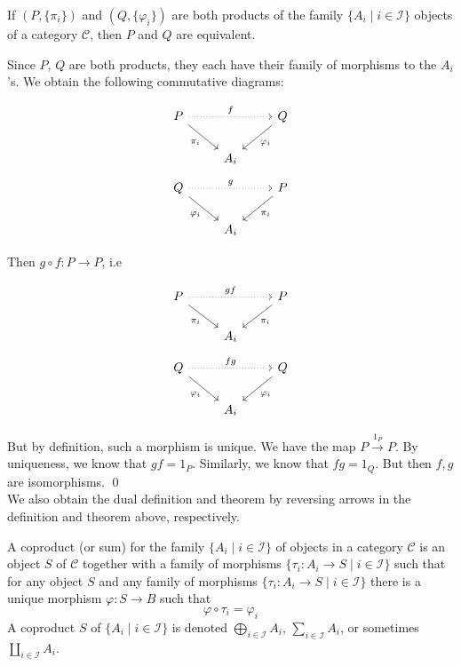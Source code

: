 \begin{thm}\label{product-dual}
If $\left(P,\{\pi_i\}\right)$ and $\left(Q,\{\varphi_i\}\right)$ are both products of the family $\{A_i\;|\; i \in \mathcal{I}\}$ objects of a category $\mathcal{C}$, then $P$ and $Q$ are equivalent. 
\end{thm}

\pf Since $P$, $Q$ are both products, they each have their family of morphisms to the $A_i$'s. We obtain the following commutative diagrams:

\begin{multicols}{2}
	\[
	\begin{tikzcd}
	P \arrow[dotted]{rr}{f}
	 \arrow[swap]{dr}{\pi_i}
 	&  & Q \arrow{dl}{\varphi_i} \\
 	& A_i & 
	\end{tikzcd}
	\]
\break 
	\[
	\begin{tikzcd}
	Q \arrow[dotted]{rr}{g}
 \arrow[swap]{dr}{\varphi_i}
	 &   & P \arrow{dl}{\pi_i} \\
	 & A_i & 
	\end{tikzcd}
	\]
\end{multicols}
Then $g\circ f:P \rightarrow P$, i.e
\begin{multicols}{2}
	\[
	\begin{tikzcd}
	P \arrow[dotted]{rr}{g f}
	 \arrow[swap]{dr}{\pi_i}
	 &  & P \arrow{dl}{\pi_i} \\
	 & A_i & 
	\end{tikzcd}
	\]
\break 
	\[
	\begin{tikzcd}
	Q \arrow[dotted]{rr}{f g}
	 \arrow[swap]{dr}{\varphi_i}
	 & & Q \arrow{dl}{\varphi_i} \\
	 & A_i & 
	\end{tikzcd}
	\]
\end{multicols}
But by definition, such a morphism is unique. We have the map $P \xrightarrow{1_P} P$. By uniqueness, we know that $g f= 1_P$. Similarly, we know that $f g=1_Q$. But then $f,g$ are isomorphisms.
\qed \\

We also obtain the dual definition and theorem by reversing arrows in the definition and theorem above, respectively.


\begin{dfn}[Coproduct]
A coproduct (or sum) for the family $\{A_i\;|\; i \in \mathcal{I}\}$ of objects in a category $\mathcal{C}$ is an object $S$ of $\mathcal{C}$ together with a family of morphisms $\{\tau_i :A_i \rightarrow S \;|\; i \in \mathcal{I}\}$ such that for any object $S$ and any family of morphisms $\{\tau_i: A_i \rightarrow S\;|\; i \in \mathcal{I}\}$ there is a unique morphism $\varphi: S \rightarrow B$ such that 
	\[
	\varphi \circ \tau_i=\varphi_i
	\]
A coproduct $S$ of $\{A_i \;|\; i \in \mathcal{I}\}$ is denoted $\bigoplus_{i \in \mathcal{I}} A_i$, $\sum_{i \in \mathcal{I}} A_i$, or sometimes $\amalg_{i \in \mathcal{I}} A_i$.
\end{dfn}


